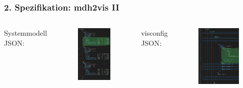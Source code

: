\documentclass{presentation}
\begin{document}
\begin{frame}
	\frametitle{2. Spezifikation: mdh2vis II}
	\begin{columns}
		Systemmodell JSON:
		\begin{figure}
			\includegraphics[width=0.6\linewidth]{images/gemm_model.png}
		\end{figure}
		visconfig JSON:
		\begin{figure}
			\includegraphics[width=0.7\linewidth]{images/gemm_model_vis.png}
		\end{figure}
	\end{columns}
\end{frame}
\end{document}
